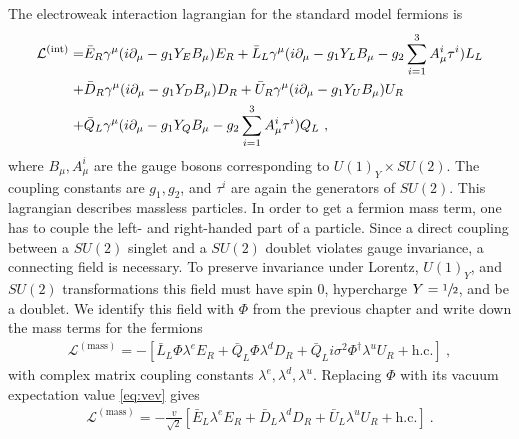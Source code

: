 The electroweak interaction lagrangian for the standard model fermions is
\begin{align}\label{eq:LFermion}
	\mathcal{L}^{(\text{int})} = &\bar{E}_R\gamma^\mu(i\partial_\mu-g_1Y_EB_\mu)E_R + \bar{L}_L\gamma^\mu(i\partial_\mu-g_1Y_LB_\mu-g_2\sum_{i=1}^{3}A_\mu^i\tau^i)L_L \notag \\
	+ &\bar{D}_R\gamma^\mu(i\partial_\mu-g_1Y_DB_\mu)D_R + \bar{U}_R\gamma^\mu(i\partial_\mu-g_1Y_UB_\mu)U_R \notag \\
	+ &\bar{Q}_L\gamma^\mu(i\partial_\mu-g_1Y_QB_\mu-g_2\sum_{i=1}^{3}A_\mu^i\tau^i)Q_L \ ,
\end{align}
where $B_\mu, A_\mu^i$ are the gauge bosons corresponding to $U(1)_Y\times SU(2)$. The coupling constants are $g_1,g_2$, and $\tau^i$ are again the generators of $SU(2)$. This lagrangian describes massless particles. In order to get a fermion mass term, one has to couple the left- and right-handed part of a particle. Since a direct coupling between a $SU(2)$ singlet and a $SU(2)$ doublet violates gauge invariance, a connecting field is necessary. To preserve invariance under Lorentz, $U(1)_Y$, and $SU(2)$ transformations this field must have spin 0, hypercharge $Y=\sfrac{1}{2}$, and be a doublet. We identify this field with $\Phi$ from the previous chapter and write down the mass terms for the fermions
\begin{align}
	\mathcal{L}^{(\text{mass})} = -\left[\bar{L}_L\Phi\lambda^e  E_R  + \bar{Q}_L\Phi\lambda^d D_R + \bar{Q}_Li\sigma^2\Phi^\dagger\lambda^u U_R + \text{h.c.}\right] \ ,
\end{align}
with complex matrix coupling constants $\lambda^e,\lambda^d,\lambda^u$. Replacing $\Phi$ with its vacuum expectation value \eqref{eq:vev} gives
\begin{align}\label{eq:LMass}
	\mathcal{L}^{(\text{mass})} = -\frac{v}{\sqrt{2}}\left[ \bar{E}_L\lambda^e E_R  + \bar{D}_L \lambda^dD_R + \bar{U}_L\lambda^u U_R + \text{h.c.}\right] \ .
\end{align}



